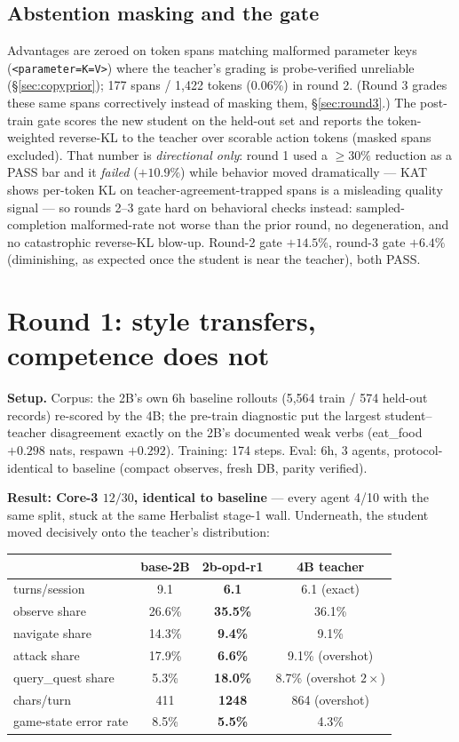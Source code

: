 \documentclass[11pt]{article}
\begin{document}
\subsection{Abstention masking and the gate}
\label{sec:gate}
Advantages are zeroed on token spans matching malformed parameter keys
(\texttt{<parameter=K=V>}) where the teacher's grading is probe-verified unreliable
(\S\ref{sec:copyprior}); 177 spans / 1{,}422 tokens (0.06\%) in round 2. (Round 3 grades these
same spans correctively instead of masking them, \S\ref{sec:round3}.) The post-train gate scores
the new student on the held-out set and reports the token-weighted reverse-KL to the teacher over
scorable action tokens (masked spans excluded). That number is \emph{directional only}: round 1
used a $\ge 30\%$ reduction as a PASS bar and it \emph{failed} ($+10.9\%$) while behavior moved
dramatically --- KAT~\cite{kat} shows per-token KL on teacher-agreement-trapped spans is a
misleading quality signal --- so rounds 2--3 gate hard on behavioral checks instead:
sampled-completion malformed-rate not worse than the prior round, no degeneration, and no
catastrophic reverse-KL blow-up. Round-2 gate $+14.5\%$, round-3 gate $+6.4\%$ (diminishing, as
expected once the student is near the teacher), both PASS.

\section{Round 1: style transfers, competence does not}

\textbf{Setup.} Corpus: the 2B's own 6h baseline rollouts (5{,}564 train / 574 held-out records)
re-scored by the 4B; the pre-train diagnostic put the largest student--teacher disagreement
exactly on the 2B's documented weak verbs (eat\_food $+0.298$ nats, respawn $+0.292$).
Training: 174 steps. Eval: 6h, 3 agents, protocol-identical to baseline (compact observes,
fresh DB, parity verified).

\textbf{Result: Core-3 $12/30$, identical to baseline} --- every agent 4/10 with the same split,
stuck at the same Herbalist stage-1 wall. Underneath, the student moved decisively onto the
teacher's distribution:

\begin{center}
\begin{tabular}{lccc}
\toprule
 & base-2B & 2b-opd-r1 & 4B teacher \\
\midrule
turns/session & 9.1 & \textbf{6.1} & 6.1 (exact) \\
observe share & 26.6\% & \textbf{35.5\%} & 36.1\% \\
navigate share & 14.3\% & \textbf{9.4\%} & 9.1\% \\
attack share & 17.9\% & \textbf{6.6\%} & 9.1\% (overshot) \\
query\_quest share & 5.3\% & \textbf{18.0\%} & 8.7\% (overshot $2\times$) \\
chars/turn & 411 & \textbf{1248} & 864 (overshot) \\
game-state error rate & 8.5\% & \textbf{5.5\%} & 4.3\% \\
\bottomrule
\end{tabular}
\end{center}
\end{document}
